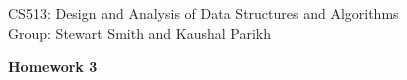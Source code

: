 \documentclass[11pt]{article}
\begin{document}

\noindent CS513: Design and Analysis of Data Structures and Algorithms \\
        Group: Stewart Smith and Kaushal Parikh\\

        \begin{center}
        \LARGE{\textbf{Homework 3}}\\
            \end{center}

            \vspace{.1in}


            \begin{enumerate}


\end{enumerate}
\end{document}
